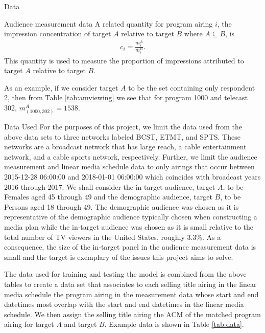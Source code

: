 \begin{chapter}{Data}
\begin{section}{Audience measurement data}
  A related quantity for program airing $i$, the impression concentration of target $A$ relative to target $B$ where $A \subseteq B$, is
  \begin{align*}
    c_i = \frac{m_{i}^A}{m_{i}^B}.
  \end{align*}
  This quantity is used to measure the proportion of impressions attributed to target $A$ relative to target $B$.

  As an example, if we consider target $A$ to be the set containing only respondent 2, then
  from Table \ref{tab:amviewing} we see that for program 1000 and telecast 302, $m_{(1000, 302)}^A = 1538$.
\end{section}

\begin{section}{Data Used}\label{data:used}
  For the purposes of this project, we limit the data used from the above data sets
  to three networks labeled BCST, ETMT, and SPTS. These networks are a broadcast network
  that has large reach, a cable entertainment network, and a cable sports network, respectively.
  Further, we limit the audience measurement and linear media schedule data to only airings that occur
  between 2015-12-28 06:00:00 and 2018-01-01 06:00:00 which coincides with broadcast years 2016 through 2017.
  We shall consider the in-target audience, target $A$, to be Females aged 45 through 49 and the demographic audience, target $B$,
  to be Persons aged 18 through 49. The demographic audience was chosen as it is representative
  of the demographic audience typically chosen when constructing a media plan while the in-target
  audience was chosen as it is small relative to the total number of TV viewers in the United States, roughly 3.3\%.
  As a consequence, the size of the in-target panel in the audience measurement data is small and the target is
  exemplary of the issues this project aims to solve.

  The data used for training and testing the model is combined from the above tables to create a
  data set that associates to each selling title airing in the linear media schedule the program airing in the measurement data whose start and end datetimes
  most overlap with the start and end datetimes in the linear media schedule. We then assign
  the selling title airing the ACM of the matched program airing for target $A$ and target $B$.
  Example data is shown in Table \ref{tab:data}.


\end{section}
\end{chapter}
